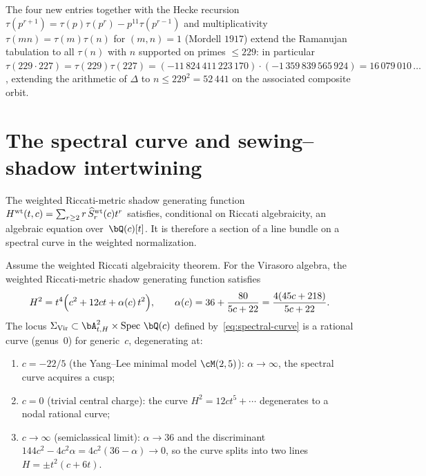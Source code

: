 \begin{remark}%
\label{rem:tau-hecke-closure-229}%
The four new entries together with the Hecke recursion
$\tau(p^{r+1}) = \tau(p)\tau(p^r) - p^{11}\tau(p^{r-1})$ and
multiplicativity $\tau(mn) = \tau(m)\tau(n)$ for $(m,n) = 1$
\textup{(}Mordell $1917$\textup{)}
extend the Ramanujan tabulation to all $\tau(n)$ with $n$
supported on primes $\le 229$: in particular
$\tau(229\cdot 227) = \tau(229)\tau(227) =
(-11\,824\,411\,223\,170)\cdot(-1\,359\,839\,565\,924)
= 16\,079\,010\,\ldots$, extending the arithmetic of $\Delta$ to
$n\le 229^2 = 52\,441$ on the associated composite orbit.
\end{remark}

\section{The spectral curve and sewing--shadow intertwining}
\label{sec:spectral-curve}

The weighted Riccati-metric shadow generating function
$H^{\rm wt}(t,c)=\sum_{r\ge2}r\,\widehat S^{\rm wt}_r(c)t^r$
satisfies, conditional on Riccati algebraicity, an algebraic equation
over~$\bQ(c)[t]$. It is therefore a section of a line bundle on a
spectral curve in the weighted normalization.

\begin{theorem}
\label{thm:spectral-curve}
\ClaimStatusConditional
{}
Assume the weighted Riccati algebraicity theorem. For the Virasoro
algebra, the weighted Riccati-metric shadow
generating function satisfies
\begin{equation}\label{eq:spectral-curve}
 H^2 = t^4\Bigl(c^2 + 12ct + \alpha(c)\,t^2\Bigr),
 \qquad
 \alpha(c) = 36 + \frac{80}{5c+22}
 = \frac{4(45c+218)}{5c+22}.
\end{equation}
The locus $\Sigma_{\mathrm{Vir}} \subset \bA^2_{t,H}
\times \operatorname{Spec}\,\bQ(c)$ defined
by~\eqref{eq:spectral-curve} is a rational curve
\textup{(}genus~$0$\textup{)} for generic~$c$, degenerating at:
\begin{enumerate}[label=\textup{(\roman*)}]
\item $c = -22/5$ \textup{(}the Yang--Lee minimal model
 $\cM(2,5)$\textup{)}: $\alpha \to \infty$, the spectral curve
 acquires a cusp;
\item $c = 0$ \textup{(}trivial central charge\textup{)}:
 the curve $H^2 = 12ct^5 + \cdots$ degenerates to a nodal
 rational curve;
\item $c \to \infty$ \textup{(}semiclassical limit\textup{)}:
 $\alpha \to 36$ and the discriminant $144c^2 - 4c^2\alpha =
 4c^2(36 - \alpha) \to 0$, so the curve splits into two lines
 $H = \pm t^2(c + 6t)$.
\end{enumerate}
\end{theorem}

